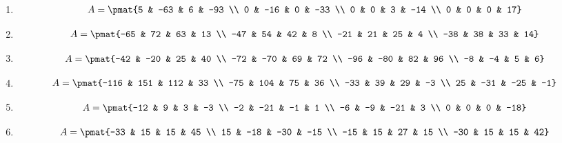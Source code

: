 \begin{enumerate}
\item

\begin{align*}
A = \pmat{5 & -63 & 6 & -93 \\ 0 & -16 & 0 & -33 \\ 0 & 0 & 3 & -14 \\ 0 & 0 & 0 & 17}
\end{align*}

\item

\begin{align*}
A = \pmat{-65 & 72 & 63 & 13 \\ -47 & 54 & 42 & 8 \\ -21 & 21 & 25 & 4 \\ -38 & 38 & 33 & 14}
\end{align*}

\item

\begin{align*}
A = \pmat{-42 & -20 & 25 & 40 \\ -72 & -70 & 69 & 72 \\ -96 & -80 & 82 & 96 \\ -8 & -4 & 5 & 6}
\end{align*}

\item

\begin{align*}
A = \pmat{-116 & 151 & 112 & 33 \\ -75 & 104 & 75 & 36 \\ -33 & 39 & 29 & -3 \\ 25 & -31 & -25 & -1}
\end{align*}

\item

\begin{align*}
A = \pmat{-12 & 9 & 3 & -3 \\ -2 & -21 & -1 & 1 \\ -6 & -9 & -21 & 3 \\ 0 & 0 & 0 & -18}
\end{align*}

\item

\begin{align*}
A = \pmat{-33 & 15 & 15 & 45 \\ 15 & -18 & -30 & -15 \\ -15 & 15 & 27 & 15 \\ -30 & 15 & 15 & 42}
\end{align*}


\end{enumerate}
